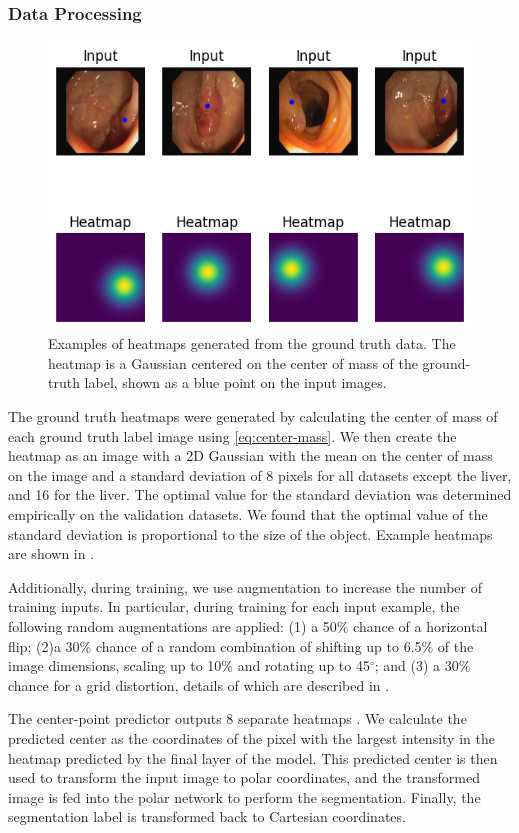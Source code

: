 \subsubsection{Data Processing}
 
 	\begin{figure}[b!]
		\centering
		\includegraphics[width=0.8\linewidth]{images/4/heatmaps}
		\caption{Examples of heatmaps generated from the ground truth data. The heatmap is a Gaussian centered on the center of mass of the ground-truth label, shown as a blue point on the input images. \cite{bencevicTrainingPolarImage2021}}
		\label{fig:heatmap}
	\end{figure}
	
The ground truth heatmaps were generated by calculating the center of mass of each ground truth label 
image using \eqref{eq:center-mass}. We then create the heatmap as an image with a 2D Gaussian with the
mean on 
the center of mass on the image and a standard deviation of 8 pixels for all datasets except the liver, and 16 for the liver. The optimal value for the standard deviation was determined empirically on the 
validation datasets. We found that the optimal value of the standard deviation is proportional to the size 
of the object.
Example heatmaps are shown in 
.
	
Additionally, during training, we use augmentation to increase the number of training inputs. In 
particular, during training for each input example, the following random augmentations are applied: (1) a 50\% chance of a horizontal flip; (2)a  30\% chance of a random combination of shifting up to 6.5\% of the image dimensions, scaling up to 10\% and rotating up to 45$^{\circ}$; and (3) a 30\% chance for a grid distortion, details of which are described in \cite{info11020125}.
	
The center-point predictor outputs 8 separate heatmaps \cite{newellStackedHourglassNetworks2016}. We
calculate the predicted center as the coordinates of the pixel with the largest intensity in the heatmap
predicted by the final layer of the model. This predicted center is then used to transform the input
image to polar coordinates, and the transformed image is fed into the polar network to perform
the segmentation. Finally, the segmentation label is transformed back to Cartesian coordinates.
    
